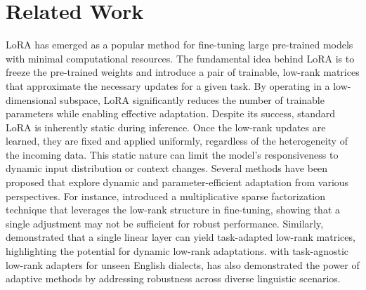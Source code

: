 \section{Related Work}
LoRA has emerged as a popular method for fine-tuning large pre-trained models with minimal computational resources. The fundamental idea behind LoRA is to freeze the pre-trained weights and introduce a pair of trainable, low-rank matrices that approximate the necessary updates for a given task. By operating in a low-dimensional subspace, LoRA significantly reduces the number of trainable parameters while enabling effective adaptation. Despite its success, standard LoRA is inherently static during inference. Once the low-rank updates are learned, they are fixed and applied uniformly, regardless of the heterogeneity of the incoming data. This static nature can limit the model's responsiveness to dynamic input distribution or context changes. Several methods have been proposed that explore dynamic and parameter-efficient adaptation from various perspectives. For instance, \citet{chen2024multiplicative} introduced a multiplicative sparse factorization technique that leverages the low-rank structure in fine-tuning, showing that a single adjustment may not be sufficient for robust performance. Similarly, \citet{kim2024single} demonstrated that a single linear layer can yield task-adapted low-rank matrices, highlighting the potential for dynamic low-rank adaptations. \citet{xiao2023task} with task-agnostic low-rank adapters for unseen English dialects, has also demonstrated the power of adaptive methods by addressing robustness across diverse linguistic scenarios.

